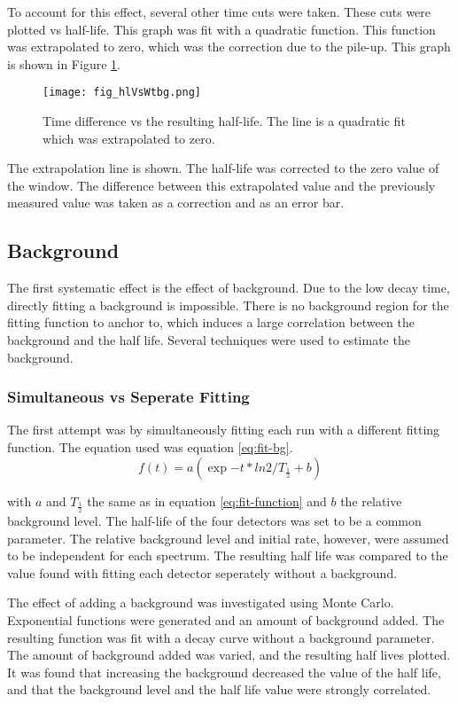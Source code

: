 To account for this effect, several other time cuts were taken.
These cuts were plotted vs half-life.
This graph was fit with a quadratic function.
This function was extrapolated to zero, which was the correction due to the pile-up.
This graph is shown in Figure \ref{fig:timediffvhl}. 

\begin{figure}[!htb]
\centerline{\texttt{[image: fig\_hlVsWtbg.png]}}
\caption{Time difference vs the resulting half-life.
	 The line is a quadratic fit which was extrapolated to zero.
	}
\label{fig:timediffvhl}
\end{figure}
 
The extrapolation line is shown.
The half-life was corrected to the zero value of the window.
The difference between this extrapolated value and the previously measured value was taken as a correction and as an error bar.
 
\subsection{Background}

The first systematic effect is the effect of background.
Due to the low decay time, directly fitting a background is impossible.
There is no background region for the fitting function to anchor to, which induces a large correlation between the background and the half life.
Several techniques were used to estimate the background.

\subsubsection{Simultaneous vs Seperate Fitting}
The first attempt was by simultaneously fitting each run with a different fitting function.
The equation used was equation \ref{eq:fit-bg}. 
%
\begin{equation}
	f(t) = a(\exp{-t*ln2/T_{\frac{1}{2}}} + b)
	\label{eq:fit-bg}
\end{equation}
%

with $a$ and $T_{\frac{1}{2}}$ the same as in equation \ref{eq:fit-function} and $b$ the relative background level.
The half-life of the four detectors was set to be a common parameter. 
The relative background level and initial rate, however, were assumed to be independent for each spectrum.
The resulting half life was compared to the value found with fitting each detector seperately without a background.

The effect of adding a background was investigated using Monte Carlo.
Exponential functions were generated and an amount of background added.
The resulting function was fit with a decay curve without a background parameter.
The amount of background added was varied, and the resulting half lives plotted.
It was found that increasing the background decreased the value of the half life, and that the background level and the half life value were strongly correlated.

